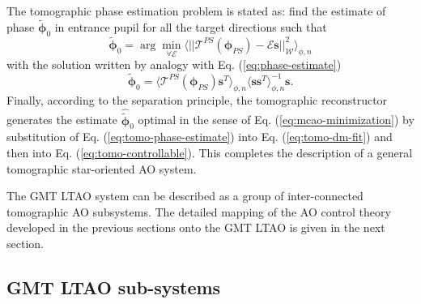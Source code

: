 The tomographic phase estimation problem is stated as: find the estimate of
phase $\tilde{\bm{\phi}}_{0}$ in entrance pupil for all the target
directions such that
\begin{equation} \label{eq:tomo-phase-estimation}
	\tilde{\bm{\phi}}_{0} = \arg \min_{\forall \mathcal{E}}
	\langle
	||
	\mathcal{T}^{PS} (\bm{\phi}_{PS}) -\mathcal{E} \bm{s}
	||^{2}_{\mathcal{W}}
	\rangle_{\phi,n}
\end{equation}
with the solution written by analogy with Eq. (\ref{eq:phase-estimate})
\begin{equation} \label{eq:tomo-phase-estimate}
  \tilde{\bm{\phi}}_{0} =
  \langle
  \mathcal{T}^{PS} (\bm{\phi}_{PS}) \bm{s}^{T}
  \rangle_{\phi,n}
  \langle
  \bm{s} \bm{s}^{T}
  \rangle_{\phi,n}^{-1} \bm{s}.
\end{equation}
Finally, according to the separation principle, the tomographic
reconstructor generates the estimate $\hat{\tilde{\bm{\phi}}}_{0}$ optimal in
the sense of Eq. (\ref{eq:mcao-minimization}) by substitution of Eq.
(\ref{eq:tomo-phase-estimate}) into Eq. (\ref{eq:tomo-dm-fit}) and then into
Eq. (\ref{eq:tomo-controllable}). This completes the description of a general
tomographic star-oriented AO system.

The GMT LTAO system can be described as a group of inter-connected tomographic
AO subsystems. The detailed mapping of the AO control theory developed in the
previous sections onto the GMT LTAO is given in the next section.

\subsection{GMT LTAO sub-systems}
\label{subsec:ltao-sub-systems}

\mbox{}

